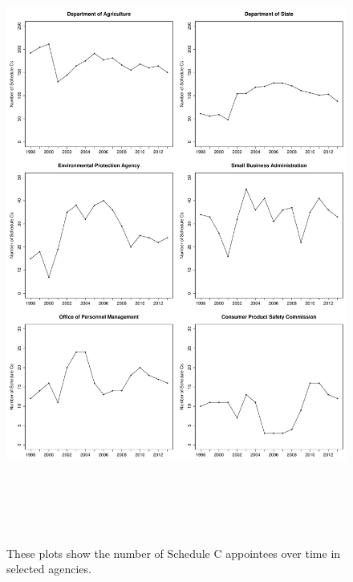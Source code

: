 \documentclass[12pt]{article}
\begin{document}
\newpage
\begin{figure}[!htb]
\begin{center}
\includegraphics[height=8in,width=6in]{CountofSCsOverTimeSelectAgencies.pdf}
\caption{These plots show the number of Schedule C appointees over time in selected agencies.}
\end{center}
\end{figure}
\end{document}
